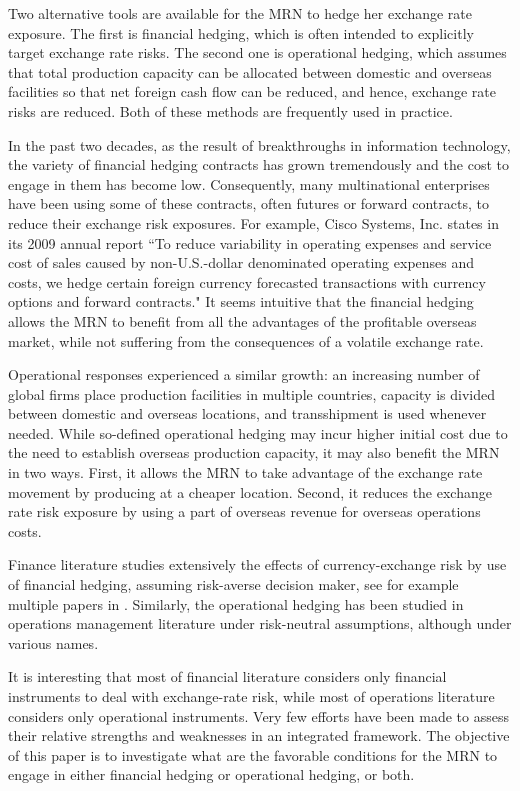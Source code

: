 \documentclass[mnsc,nonblindrev,copyedit]{informs2_wz} %
\begin{document}
Two alternative tools are available for the MRN to hedge her exchange rate exposure.  The first is financial hedging, which is often intended to explicitly target exchange rate risks.  The second one is operational hedging, which assumes that total production capacity can be allocated between domestic and overseas facilities so that net foreign cash flow can be reduced, and hence, exchange rate risks are reduced.  Both of these methods are frequently used in practice.

In the past two decades, as the result of breakthroughs in information technology, the variety of financial hedging contracts has grown tremendously and the cost to engage in them has become low.  Consequently, many multinational enterprises have been using some of these contracts, often futures or forward contracts, to reduce their exchange risk exposures.  For example, Cisco Systems, Inc. states in its 2009 annual report \cite{cisco}  ``To reduce variability in operating expenses and service cost of sales caused by non-U.S.-dollar denominated operating expenses and costs, we hedge certain foreign currency forecasted transactions with currency options and forward contracts."  It seems intuitive that the financial hedging allows the MRN to benefit from all the advantages of the profitable overseas market, while not suffering from the consequences of a volatile exchange rate.  

Operational responses experienced a similar growth: an increasing number of global firms place production facilities in multiple countries, capacity is divided between domestic and overseas locations, and transshipment is used whenever needed.  While so-defined operational hedging may incur higher initial cost due to the need to establish overseas production capacity, it may also benefit the MRN in two ways.  First, it allows the MRN to take advantage of the exchange rate movement by producing at a cheaper location.  Second, it reduces the exchange rate risk exposure by using a part of overseas revenue for overseas operations costs.  

Finance literature studies extensively the effects of currency-exchange risk by use of financial hedging, assuming risk-averse decision maker, see for example multiple papers in \cite{Fhedge1, Fhedge2}.
Similarly, the operational hedging has been studied in operations management literature under risk-neutral assumptions, although under various names.  

It is interesting that most of financial literature considers only financial instruments to deal with exchange-rate risk, while most of operations literature considers only operational instruments.  Very few efforts have been made to assess their relative strengths and weaknesses in an integrated framework.  The objective of this paper is to investigate what are the favorable conditions for the MRN to engage in either financial hedging or operational hedging, or both.
\end{document}
